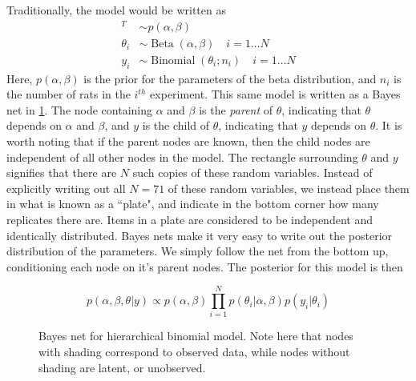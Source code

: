Traditionally, the model would be written as 
%
\begin{align*}
	[\alpha,\beta]^T &\sim p(\alpha, \beta) \\
	\theta_i &\sim \operatorname{Beta}(\alpha,\beta) \quad i = 1 \dots N\\
	y_i &\sim \operatorname{Binomial}(\theta_i ; n_i) \quad i = 1 \dots N
	\end{align*}
%
Here, $ p(\alpha, \beta)  $ is the prior for the parameters of the beta distribution, and $ n_i $ is the number of rats in the $ i^{th} $ experiment.  This same model is written as a Bayes net in \cref{bayesnet}.   The node containing $ \alpha $ and $ \beta $ is the \textit{parent} of $ \theta $, indicating that $ \theta $ depends on $ \alpha $ and $ \beta $, and $ y $ is the child of $ \theta $, indicating that $ y $ depends on $ \theta $. It is worth noting that if the parent nodes are known, then the child nodes are independent of all other nodes in the model. The rectangle surrounding $ \theta $ and $ y $ signifies that there are $ N $ such copies of these random variables.  Instead of explicitly writing out all $ N=71 $ of these random variables, we instead place them in what is known as a ``plate", and indicate in the bottom corner how many replicates there are.  Items in a plate are considered to be independent and identically distributed.  Bayes nets make it very easy to write out the posterior distribution of the parameters.  We simply follow the net from the bottom up, conditioning each node on it's parent nodes.  The posterior for this model is then

 \[ p(\alpha,\beta, \theta \vert y) \propto p(\alpha,\beta) \prod_{i = 1}^N p(\theta_i \vert \alpha, \beta) p(y_i\vert \theta_i)  \]


\begin{figure}[h!]

	\centering
	\caption[Hierarchical binomial model bayes net]{Bayes net for hierarchical binomial model.  Note here that nodes with shading correspond to observed data, while nodes without shading are latent, or unobserved.}
	\label{bayesnet}
\end{figure}

